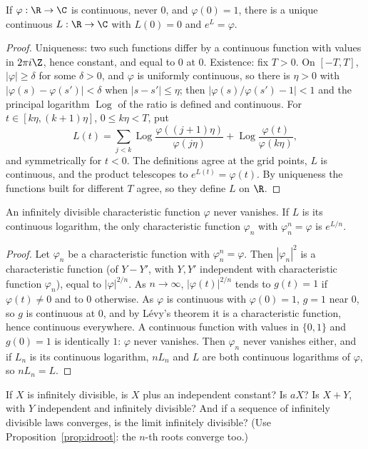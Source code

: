 \begin{lemma}\label{lem:contlog}
If $\varphi:\R\to\C$ is continuous, never $0$, and $\varphi(0)=1$, there is a unique continuous $L:\R\to\C$ with $L(0)=0$ and $e^L=\varphi$.
\end{lemma}
\begin{proof}
Uniqueness: two such functions differ by a continuous function with values in $2\pi i\Z$, hence constant, and equal to $0$ at $0$. Existence: fix $T>0$. On
$[-T,T]$, $|\varphi|\ge\delta$ for some $\delta>0$, and $\varphi$ is uniformly continuous, so there is $\eta>0$ with $|\varphi(s)-\varphi(s')|<\delta$ when
$|s-s'|\le\eta$; then $|\varphi(s)/\varphi(s')-1|<1$ and the principal logarithm $\operatorname{Log}$ of the ratio is defined and continuous. For $t\in[k\eta,(k+1)\eta]$,
$0\le k\eta<T$, put
\[
L(t)=\sum_{j<k}\operatorname{Log}\frac{\varphi((j+1)\eta)}{\varphi(j\eta)}+\operatorname{Log}\frac{\varphi(t)}{\varphi(k\eta)},
\]
and symmetrically for $t<0$. The definitions agree at the grid points, $L$ is continuous, and the product telescopes to $e^{L(t)}=\varphi(t)$. By uniqueness
the functions built for different $T$ agree, so they define $L$ on $\R$.
\end{proof}

\begin{proposition}\label{prop:idroot}
An infinitely divisible characteristic function $\varphi$ never vanishes. If $L$ is its continuous logarithm, the only characteristic function $\varphi_n$ with
$\varphi_n^n=\varphi$ is $e^{L/n}$.
\end{proposition}
\begin{proof}
Let $\varphi_n$ be a characteristic function with $\varphi_n^n=\varphi$. Then $|\varphi_n|^2$ is a characteristic function (of $Y-Y'$, with $Y,Y'$ independent with
characteristic function $\varphi_n$), equal to $|\varphi|^{2/n}$. As $n\to\infty$, $|\varphi(t)|^{2/n}$ tends to $g(t)=1$ if $\varphi(t)\ne0$ and to $0$ otherwise. As
$\varphi$ is continuous with $\varphi(0)=1$, $g=1$ near $0$, so $g$ is continuous at $0$, and by L\'evy's theorem it is a characteristic function, hence continuous
everywhere. A continuous function with values in $\{0,1\}$ and $g(0)=1$ is identically $1$: $\varphi$ never vanishes. Then $\varphi_n$ never vanishes either,
and if $L_n$ is its continuous logarithm, $nL_n$ and $L$ are both continuous logarithms of $\varphi$, so $nL_n=L$.
\end{proof}

\begin{think}
If $X$ is infinitely divisible, is $X$ plus an independent constant? Is $aX$? Is $X+Y$, with $Y$ independent and infinitely divisible? And if a sequence of
infinitely divisible laws converges, is the limit infinitely divisible? (Use Proposition~\ref{prop:idroot}: the $n$-th roots converge too.)
\end{think}

